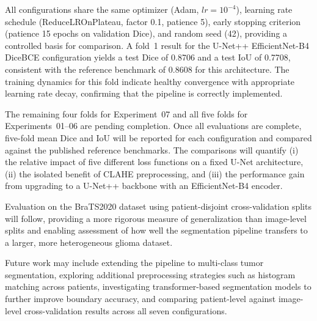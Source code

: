 \documentclass[a4paper,12pt]{article}
\begin{document}
All configurations share the same optimizer (Adam, $lr = 10^{-4}$), learning rate schedule
(ReduceLROnPlateau, factor 0.1, patience 5), early stopping criterion (patience 15 epochs on
validation Dice), and random seed (42), providing a controlled basis for comparison. A fold~1
result for the U-Net++ EfficientNet-B4 DiceBCE configuration yields a test Dice of 0.8706 and
a test IoU of 0.7708, consistent with the reference benchmark of 0.8608 for this architecture.
The training dynamics for this fold indicate healthy convergence with appropriate learning rate
decay, confirming that the pipeline is correctly implemented.

The remaining four folds for Experiment~07 and all five folds for Experiments~01--06 are
pending completion. Once all evaluations are complete, five-fold mean Dice and IoU will be
reported for each configuration and compared against the published reference benchmarks.
The comparisons will quantify (i) the relative impact of five different loss functions on a
fixed U-Net architecture, (ii) the isolated benefit of CLAHE preprocessing, and (iii) the
performance gain from upgrading to a U-Net++ backbone with an EfficientNet-B4 encoder.

Evaluation on the BraTS2020 dataset using patient-disjoint cross-validation splits will follow,
providing a more rigorous measure of generalization than image-level splits and enabling
assessment of how well the segmentation pipeline transfers to a larger, more heterogeneous
glioma dataset.

Future work may include extending the pipeline to multi-class tumor segmentation, exploring
additional preprocessing strategies such as histogram matching across patients, investigating
transformer-based segmentation models to further improve boundary accuracy, and comparing
patient-level against image-level cross-validation results across all seven configurations.


\clearpage
{}
\printbibliography
\end{document}
